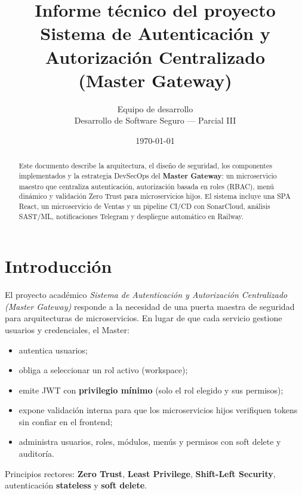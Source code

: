 \documentclass[12pt,a4paper]{article}
\title{%
  Informe técnico del proyecto\\
  \large Sistema de Autenticación y Autorización Centralizado\\
  (Master Gateway)
}
\author{Equipo de desarrollo \\ Desarrollo de Software Seguro --- Parcial III}
\date{\today}
\begin{document}
\maketitle
\begin{abstract}
Este documento describe la arquitectura, el diseño de seguridad, los componentes
implementados y la estrategia DevSecOps del \textbf{Master Gateway}: un
microservicio maestro que centraliza autenticación, autorización basada en roles
(RBAC), menú dinámico y validación Zero Trust para microservicios hijos.
El sistema incluye una SPA React, un microservicio de Ventas y un pipeline
CI/CD con SonarCloud, análisis SAST/ML, notificaciones Telegram y despliegue
automático en Railway.
\end{abstract}

\tableofcontents
\newpage

\section{Introducción}
El proyecto académico \emph{Sistema de Autenticación y Autorización Centralizado
(Master Gateway)} responde a la necesidad de una puerta maestra de seguridad
para arquitecturas de microservicios. En lugar de que cada servicio gestione
usuarios y credenciales, el Master:

\begin{itemize}[leftmargin=1.5em]
  \item autentica usuarios;
  \item obliga a seleccionar un rol activo (workspace);
  \item emite JWT con \textbf{privilegio mínimo} (solo el rol elegido y sus permisos);
  \item expone validación interna para que los microservicios hijos verifiquen
        tokens sin confiar en el frontend;
  \item administra usuarios, roles, módulos, menús y permisos con soft delete y auditoría.
\end{itemize}

Principios rectores: \textbf{Zero Trust}, \textbf{Least Privilege},
\textbf{Shift-Left Security}, autenticación \textbf{stateless} y
\textbf{soft delete}.

\end{document}
